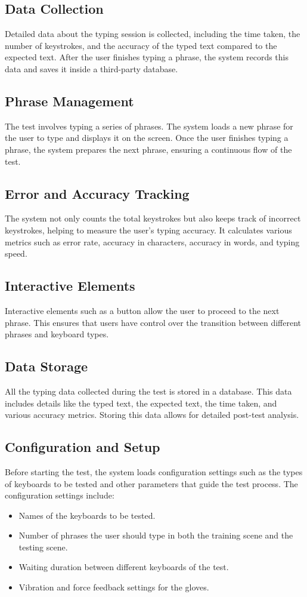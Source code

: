 \subsection{Data Collection}
Detailed data about the typing session is collected, including the time taken, the number of keystrokes, and the accuracy of the typed text compared to the expected text. After the user finishes typing a phrase, the system records this data and saves it inside a third-party database.

\subsection{Phrase Management}
The test involves typing a series of phrases. The system loads a new phrase for the user to type and displays it on the screen. Once the user finishes typing a phrase, the system prepares the next phrase, ensuring a continuous flow of the test.

\subsection{Error and Accuracy Tracking}
The system not only counts the total keystrokes but also keeps track of incorrect keystrokes, helping to measure the user's typing accuracy. It calculates various metrics such as error rate, accuracy in characters, accuracy in words, and typing speed.

\subsection{Interactive Elements}
Interactive elements such as a button allow the user to proceed to the next phrase. This ensures that users have control over the transition between different phrases and keyboard types.

\subsection{Data Storage}
All the typing data collected during the test is stored in a database. This data includes details like the typed text, the expected text, the time taken, and various accuracy metrics. Storing this data allows for detailed post-test analysis.

\subsection{Configuration and Setup}
Before starting the test, the system loads configuration settings such as the types of keyboards to be tested and other parameters that guide the test process. The configuration settings include:
\begin{itemize}
    \item Names of the keyboards to be tested.
    \item Number of phrases the user should type in both the training scene and the testing scene.
    \item Waiting duration between different keyboards of the test.
    \item Vibration and force feedback settings for the gloves.
\end{itemize}

